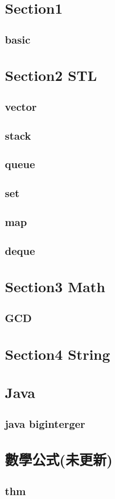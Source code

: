 \section{Section1}
    \subsection{basic}
        
\section{Section2 STL}
    \subsection{vector}
        
    \subsection{stack}
        
    \subsection{queue}
        
    \subsection{set}
        
    \subsection{map}
        
    \subsection{deque}
\section{Section3 Math}
    \subsection{GCD}
            
\section{Section4 String}

\section{Java}
    \subsection{java biginterger}
        


\section{數學公式(未更新)}
    \subsection{thm}
        
        
